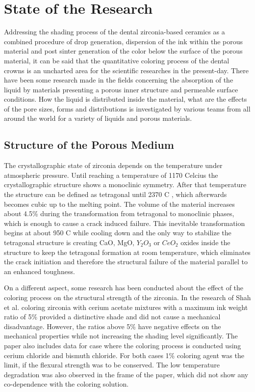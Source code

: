\chapter{State of the Research}
\label{sec:stand_forschung}

Addressing the shading process of the dental zirconia-based ceramics as a combined procedure of drop generation, dispersion of the ink within the porous material and post sinter generation of the color below the surface of the porous material, it can be said that the quantitative coloring process of the dental crowns is an uncharted area for the scientific researches in the present-day. There have been some research made in the fields concerning the absorption of the liquid by materials presenting a porous inner structure and permeable surface conditions. How the liquid is distributed inside the material, what are the effects of the pore sizes, forms and distributions is investigated by various teams from all around the world for a variety of liquids and porous materials. 



\section{Structure of the Porous Medium}

The crystallographic state of zirconia depends on the temperature under atmospheric pressure. Until reaching a temperature of {1170\textdegree} Celcius the crystallographic structure shows a monoclinic symmetry. After that temperature the structure can be defined as tetragonal until {2370\textdegree} C , which afterwards becomes cubic up to the melting point. The volume of the material increases about 4.5\% during the transformation from tetragonal to monoclinic phases, which is enough to cause a crack induced failure. This inevitable transformation begins at about {950\textdegree} C while cooling down and the only way to stabilize the tetragonal structure is creating CaO, MgO, $Y_{2}O_{3}$ or $CeO_{2}$ oxides inside the structure to keep the tetragonal formation  at room temperature, which eliminates the crack initiation and therefore the structural failure of the material parallel to an enhanced toughness. \citep{denry2008state}

On a different aspect, some research has been conducted about the effect of the coloring process on the structural strength of the zirconia. In the research of Shah et al. coloring zirconia with cerium acetate mixtures with a maximum ink weight ratio of 5\% provided a distinctive shade and did not cause a mechanical disadvantage. However, the ratios above 5\% have negative effects on the mechanical properties while not increasing the shading level significantly. The paper also includes data for case where the coloring process is conducted using cerium chloride and bismuth chloride. For both cases 1\% coloring agent was the limit, if the flexural strength was to be conserved. The low temperature degradation was also observed in the frame of the paper, which did not show any co-dependence with the coloring solution.\citep{shah2008effect}

